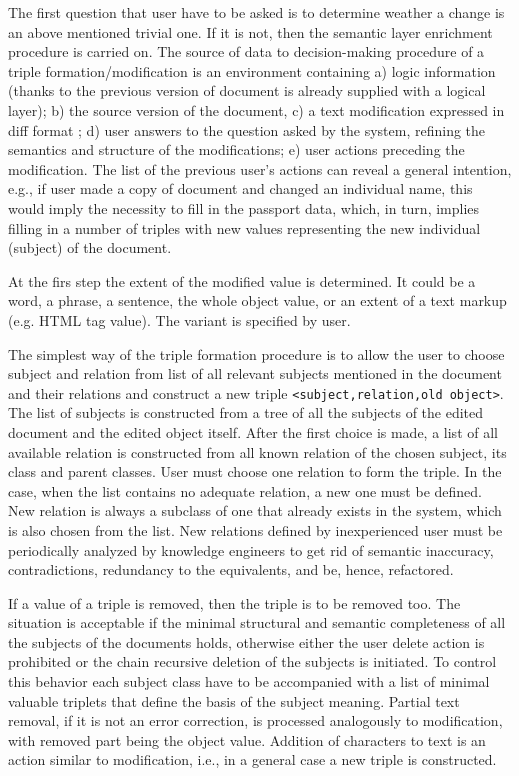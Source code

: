 \documentclass[conference]{IEEEtran}
\begin{document}
The first question that user have to be asked is to determine weather
a change is an above mentioned trivial one.  If it is not, then the
semantic layer enrichment procedure is carried on.  The source of data
to decision-making procedure of a triple formation/modification is an
environment containing a) logic information (thanks to the previous
version of document is already supplied with a logical layer); b) the
source version of the document, c) a text modification expressed in
diff format \cite{b9}; d) user answers to the question asked by the
system, refining the semantics and structure of the modifications; e)
user actions preceding the modification.  The list of the previous
user's actions can reveal a general intention, e.g., if user made a
copy of document and changed an individual name, this would imply the
necessity to fill in the passport data, which, in turn, implies
filling in a number of triples with new values representing the new
individual (subject) of the document.

At the firs step the extent of the modified value is determined.  It
could be a word, a phrase, a sentence, the whole object value, or an
extent of a text markup (e.g. HTML tag value).  The variant is
specified by user.

The simplest way of the triple formation procedure is to allow the
user to choose subject and relation from list of all relevant subjects
mentioned in the document and their relations and construct a new
triple \texttt{<subject,relation,old object>}.  The list of subjects
is constructed from a tree of all the subjects of the edited document
and the edited object itself.  After the first choice is made, a list
of all available relation is constructed from all known relation of
the chosen subject, its class and parent classes.  User must choose
one relation to form the triple.  In the case, when the list contains
no adequate relation, a new one must be defined.  New relation is
always a subclass of one that already exists in the system, which is
also chosen from the list.  New relations defined by inexperienced user
must be periodically analyzed by knowledge engineers to get rid of
semantic inaccuracy, contradictions, redundancy to the equivalents,
and be, hence, refactored.

If a value of a triple is removed, then the triple is to be removed
too.  The situation is acceptable if the minimal structural and
semantic completeness of all the subjects of the documents holds,
otherwise either the user delete action is prohibited or the chain
recursive deletion of the subjects is initiated.  To control this
behavior each subject class have to be accompanied with a list of
minimal valuable triplets that define the basis of the subject
meaning.  Partial text removal, if it is not an error correction, is
processed analogously to modification, with removed part being the
object value.  Addition of characters to text is an action similar to
modification, i.e., in a general case a new triple is constructed.
\end{document}
